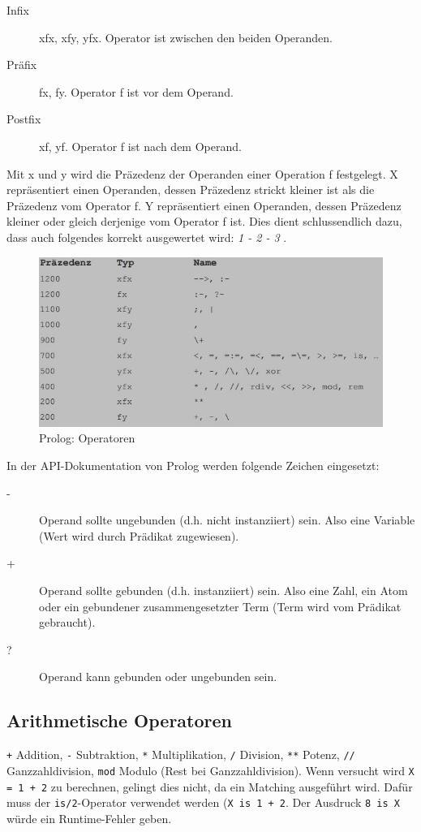 \begin{description}
	\item[Infix] xfx, xfy, yfx. Operator ist zwischen den beiden Operanden.
	\item[Präfix] fx, fy. Operator f ist vor dem Operand.
	\item[Postfix] xf, yf. Operator f ist nach dem Operand.	
\end{description}

Mit x und y wird die Präzedenz der Operanden einer Operation f festgelegt. X repräsentiert einen Operanden, dessen Präzedenz strickt kleiner ist als die Präzedenz vom Operator f. Y repräsentiert einen Operanden, dessen Präzedenz kleiner oder gleich derjenige vom Operator f ist. Dies dient schlussendlich dazu, dass auch folgendes korrekt ausgewertet wird: \emph{1 - 2 - 3 }. 

\begin{figure}[h!]
\centering
\includegraphics[width=0.7\linewidth]{fig/prolog-operatoren}
\caption{Prolog: Operatoren}
\label{fig:prolog-operatoren}
\end{figure}

\newpage
In der API-Dokumentation von Prolog werden folgende Zeichen eingesetzt:
\begin{description}
	\item[-] Operand sollte ungebunden (d.h. nicht instanziiert) sein. Also eine Variable (Wert wird durch Prädikat zugewiesen).
	\item[+] Operand sollte gebunden (d.h. instanziiert) sein. Also eine Zahl, ein Atom oder ein gebundener zusammengesetzter Term (Term wird vom Prädikat gebraucht).
	\item[?] Operand kann gebunden oder ungebunden sein.
\end{description}

\subsection{Arithmetische Operatoren}
\verb|+| Addition, \verb|-| Subtraktion, \verb|*| Multiplikation, \verb|/| Division, \verb|**| Potenz, \verb|//| Ganzzahldivision, \verb|mod| Modulo (Rest bei Ganzzahldivision). Wenn versucht wird \verb|X = 1 + 2| zu berechnen, gelingt dies nicht, da ein Matching ausgeführt wird. Dafür muss der \verb|is/2|-Operator verwendet werden (\verb|X is 1 + 2|. Der Ausdruck \verb|8 is X| würde ein Runtime-Fehler geben.

